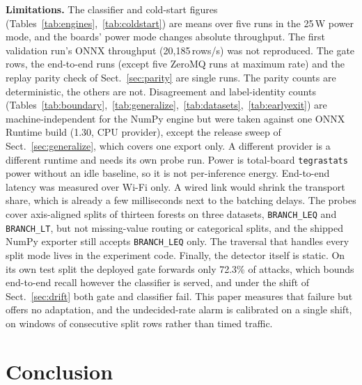 \documentclass[runningheads]{llncs}
\begin{document}
\textbf{Limitations.} The classifier and cold-start figures (Tables~\ref{tab:engines},~\ref{tab:coldstart}) are means over five runs in the 25\,W power mode, and the boards' power mode changes absolute throughput. The first validation run's ONNX throughput (20{,}185\,rows/s) was not reproduced. The gate rows, the end-to-end runs (except five ZeroMQ runs at maximum rate) and the replay parity check of Sect.~\ref{sec:parity} are single runs. The parity counts are deterministic, the others are not. Disagreement and label-identity counts (Tables~\ref{tab:boundary},~\ref{tab:generalize},~\ref{tab:datasets},~\ref{tab:earlyexit}) are machine-independent for the NumPy engine but were taken against one ONNX Runtime build (1.30, CPU provider), except the release sweep of Sect.~\ref{sec:generalize}, which covers one export only. A different provider is a different runtime and needs its own probe run. Power is total-board \texttt{tegrastats} power without an idle baseline, so it is not per-inference energy. End-to-end latency was measured over Wi-Fi only. A wired link would shrink the transport share, which is already a few milliseconds next to the batching delays. The probes cover axis-aligned splits of thirteen forests on three datasets, \texttt{BRANCH\_LEQ} and \texttt{BRANCH\_LT}, but not missing-value routing or categorical splits, and the shipped NumPy exporter still accepts \texttt{BRANCH\_LEQ} only. The traversal that handles every split mode lives in the experiment code. Finally, the detector itself is static. On its own test split the deployed gate forwards only 72.3\% of attacks, which bounds end-to-end recall however the classifier is served, and under the shift of Sect.~\ref{sec:drift} both gate and classifier fail. This paper measures that failure but offers no adaptation, and the undecided-rate alarm is calibrated on a single shift, on windows of consecutive split rows rather than timed traffic.

\section{Conclusion}
\end{document}
